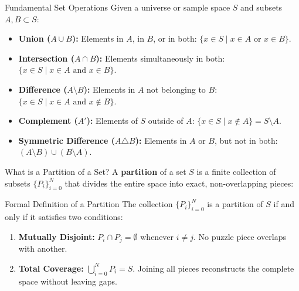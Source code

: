 \documentclass[10pt,aspectratio=169]{beamer}
\begin{document}
\begin{frame}{Fundamental Set Operations}
  Given a universe or sample space $S$ and subsets $A, B \subset S$:
  
  \vspace{0.2em}
  \begin{itemize}
    \item \textbf{Union ($A \cup B$):} Elements in $A$, in $B$, or in both: $\{x \in S \mid x \in A \text{ or } x \in B\}$. \pause
    \item \textbf{Intersection ($A \cap B$):} Elements simultaneously in both: $\{x \in S \mid x \in A \text{ and } x \in B\}$. \pause
    \item \textbf{Difference ($A \setminus B$):} Elements in $A$ not belonging to $B$: $\{x \in S \mid x \in A \text{ and } x \notin B\}$. \pause
    \item \textbf{Complement ($A'$):} Elements of $S$ outside of $A$: $\{x \in S \mid x \notin A\} = S \setminus A$. \pause
    \item \textbf{Symmetric Difference ($A \triangle B$):} Elements in $A$ or $B$, but not in both: $(A \setminus B) \cup (B \setminus A)$.
  \end{itemize}
\end{frame}

\begin{frame}{What is a Partition of a Set?}
  A \textbf{partition} of a set $S$ is a finite collection of subsets $\{P_i\}_{i=0}^{N}$ that divides the entire space into exact, non-overlapping pieces:
  
  \vspace{0.4em}
  \begin{block}{Formal Definition of a Partition}
    The collection $\{P_i\}_{i=0}^{N}$ is a partition of $S$ if and only if it satisfies two conditions:
    \begin{enumerate}
      \item \textbf{Mutually Disjoint:} $P_i \cap P_j = \emptyset$ whenever $i \neq j$. No puzzle piece overlaps with another. \pause
      \item \textbf{Total Coverage:} $\bigcup_{i=0}^{N} P_i = S$. Joining all pieces reconstructs the complete space without leaving gaps.
    \end{enumerate}
  \end{block}
\end{frame}
\end{document}
